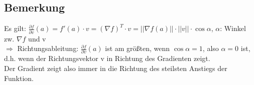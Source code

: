 \subsection{Bemerkung}
Es gilt: $\frac{\partial f}{\partial v}(a)=f'(a)\cdot v=(\nabla f)^T\cdot v = ||\nabla f(a)||\cdot ||v||\cdot \cos \alpha$, $\alpha$: Winkel zw. $\nabla f$ und v\\
$\Rightarrow$ Richtungsableitung: $\frac{\partial f}{\partial v}(a)$ ist am größten, wenn $\cos \alpha = 1$, also $\alpha=0$  ist, d.h. wenn der Richtungsvektor v in Richtung des Gradienten zeigt.\\
Der Gradient zeigt also immer in die Richtung des steilsten Anstiegs der Funktion.
